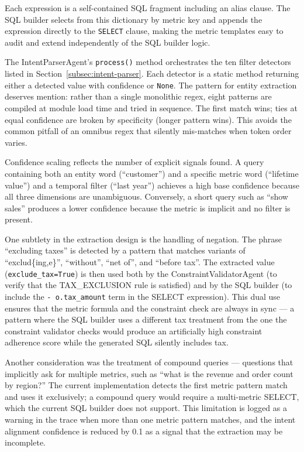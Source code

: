 \documentclass[12pt,a4paper]{report}
\begin{document}
Each expression is a self-contained SQL fragment including an alias clause. The SQL builder selects from this dictionary by metric key and appends the expression directly to the \texttt{SELECT} clause, making the metric templates easy to audit and extend independently of the SQL builder logic.

The IntentParserAgent's \texttt{process()} method orchestrates the ten filter detectors listed in Section~\ref{subsec:intent-parser}. Each detector is a static method returning either a detected value with confidence or \texttt{None}. The pattern for entity extraction deserves mention: rather than a single monolithic regex, eight patterns are compiled at module load time and tried in sequence. The first match wins; ties at equal confidence are broken by specificity (longer pattern wins). This avoids the common pitfall of an omnibus regex that silently mis-matches when token order varies.

Confidence scaling reflects the number of explicit signals found. A query containing both an entity word (``customer'') and a specific metric word (``lifetime value'') and a temporal filter (``last year'') achieves a high base confidence because all three dimensions are unambiguous. Conversely, a short query such as ``show sales'' produces a lower confidence because the metric is implicit and no filter is present.

One subtlety in the extraction design is the handling of negation. The phrase ``excluding taxes'' is detected by a pattern that matches variants of ``exclud\{ing,e\}'', ``without'', ``net of'', and ``before tax''. The extracted value (\texttt{exclude\_tax=True}) is then used both by the ConstraintValidatorAgent (to verify that the TAX\_EXCLUSION rule is satisfied) and by the SQL builder (to include the \texttt{- o.tax\_amount} term in the SELECT expression). This dual use ensures that the metric formula and the constraint check are always in sync — a pattern where the SQL builder uses a different tax treatment from the one the constraint validator checks would produce an artificially high constraint adherence score while the generated SQL silently includes tax.

Another consideration was the treatment of compound queries — questions that implicitly ask for multiple metrics, such as ``what is the revenue and order count by region?'' The current implementation detects the first metric pattern match and uses it exclusively; a compound query would require a multi-metric SELECT, which the current SQL builder does not support. This limitation is logged as a warning in the trace when more than one metric pattern matches, and the intent alignment confidence is reduced by 0.1 as a signal that the extraction may be incomplete.
\end{document}
